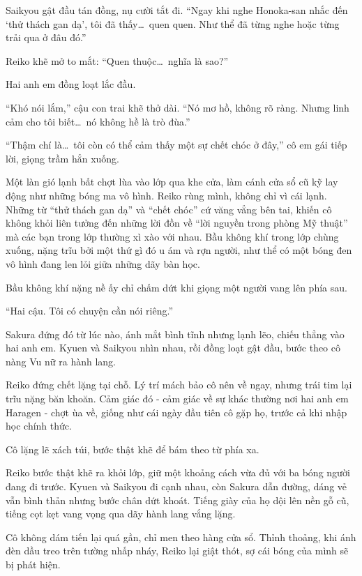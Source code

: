 \documentclass[../main.tex]{subfiles}
\begin{document}
Saikyou gật đầu tán đồng, nụ cười tắt đi. ``Ngay khi nghe Honoka-san nhắc đến `thử thách gan dạ', tôi đã thấy\dots\ quen quen. Như thể đã từng nghe hoặc từng trải qua ở đâu đó.''

Reiko khẽ mở to mắt: ``Quen thuộc\dots\ nghĩa là sao?''

Hai anh em đồng loạt lắc đầu.

``Khó nói lắm,'' cậu con trai khẽ thở dài. ``Nó mơ hồ, không rõ ràng. Nhưng linh cảm cho tôi biết\dots\ nó không hề là trò đùa.''

``Thậm chí là\dots\ tôi còn có thể cảm thấy một sự chết chóc ở đây,'' cô em gái tiếp lời, giọng trầm hẳn xuống.

Một làn gió lạnh bất chợt lùa vào lớp qua khe cửa, làm cánh cửa sổ cũ kỹ lay động như những bóng ma vô hình. Reiko rùng mình, không chỉ vì cái lạnh. Những từ ``thử thách gan dạ'' và ``chết chóc'' cứ văng vẳng bên tai, khiến cô không khỏi liên tưởng đến những lời đồn về ``lời nguyền trong phòng Mỹ thuật'' mà các bạn trong lớp thường xì xào với nhau. Bầu không khí trong lớp chùng xuống, nặng trĩu bởi một thứ gì đó u ám và rợn người, như thể có một bóng đen vô hình đang len lỏi giữa những dãy bàn học.

Bầu không khí nặng nề ấy chỉ chấm dứt khi giọng một người vang lên phía sau.

``Hai cậu. Tôi có chuyện cần nói riêng.''

Sakura đứng đó từ lúc nào, ánh mắt bình tĩnh nhưng lạnh lẽo, chiếu thẳng vào hai anh em. Kyuen và Saikyou nhìn nhau, rồi đồng loạt gật đầu, bước theo cô nàng Vu nữ ra hành lang.

Reiko đứng chết lặng tại chỗ. Lý trí mách bảo cô nên về ngay, nhưng trái tim lại trĩu nặng băn khoăn. Cảm giác đó - cảm giác về sự khác thường nơi hai anh em Haragen - chợt ùa về, giống như cái ngày đầu tiên cô gặp họ, trước cả khi nhập học chính thức.

Cô lặng lẽ xách túi, bước thật khẽ để bám theo từ phía xa.

\ct

Reiko bước thật khẽ ra khỏi lớp, giữ một khoảng cách vừa đủ với ba bóng người đang đi trước. Kyuen và Saikyou đi cạnh nhau, còn Sakura dẫn đường, dáng vẻ vẫn bình thản nhưng bước chân dứt khoát. Tiếng giày của họ dội lên nền gỗ cũ, tiếng cọt kẹt vang vọng qua dãy hành lang vắng lặng.

Cô không dám tiến lại quá gần, chỉ men theo hàng cửa sổ. Thỉnh thoảng, khi ánh đèn dầu treo trên tường nhấp nháy, Reiko lại giật thót, sợ cái bóng của mình sẽ bị phát hiện.
\end{document}
